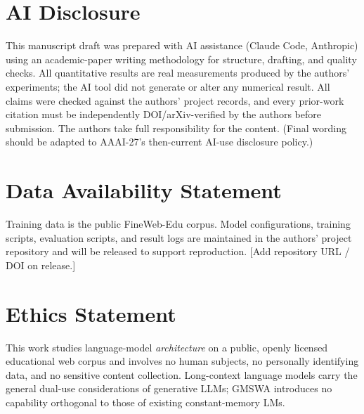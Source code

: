 \documentclass[letterpaper]{article} %
\begin{document}
\section*{AI Disclosure}
This manuscript draft was prepared with AI assistance (Claude Code, Anthropic) using an academic-paper writing methodology for structure, drafting, and quality checks. All quantitative results are real measurements produced by the authors' experiments; the AI tool did not generate or alter any numerical result. All claims were checked against the authors' project records, and every prior-work citation must be independently DOI/arXiv-verified by the authors before submission. The authors take full responsibility for the content. (Final wording should be adapted to AAAI-27's then-current AI-use disclosure policy.)

\section*{Data Availability Statement}
Training data is the public FineWeb-Edu corpus. Model configurations, training scripts, evaluation scripts, and result logs are maintained in the authors' project repository and will be released to support reproduction. [Add repository URL / DOI on release.]

\section*{Ethics Statement}
This work studies language-model \emph{architecture} on a public, openly licensed educational web corpus and involves no human subjects, no personally identifying data, and no sensitive content collection. Long-context language models carry the general dual-use considerations of generative LLMs; GMSWA introduces no capability orthogonal to those of existing constant-memory LMs.



\end{document}
